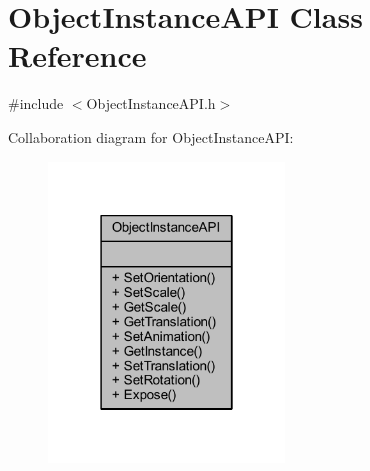 \hypertarget{class_object_instance_a_p_i}{}\section{Object\+Instance\+A\+PI Class Reference}
\label{class_object_instance_a_p_i}


{\ttfamily \#include $<$Object\+Instance\+A\+P\+I.\+h$>$}



Collaboration diagram for Object\+Instance\+A\+PI\+:\nopagebreak
\begin{figure}[H]
\begin{center}
\leavevmode
\includegraphics[width=178pt]{class_object_instance_a_p_i__coll__graph}
\end{center}
\end{figure}
